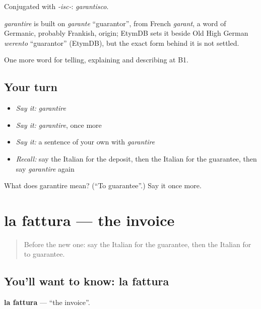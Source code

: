 Conjugated with \emph{-isc-}: \emph{garantisco}.

\begin{cousinweb}
\emph{garantire} is built on \emph{garante} \textquotedblleft{}guarantor\textquotedblright{}, from French \emph{garant}, a word of Germanic, probably Frankish, origin; EtymDB sets it beside Old High German \emph{werento} \textquotedblleft{}guarantor\textquotedblright{} (EtymDB), but the exact form behind it is not settled.
\end{cousinweb}

\begin{grammarlens}[title={What you've built}]
One more word for telling, explaining and describing at B1.
\end{grammarlens}

\subsection*{Your turn}
\begin{itemize}
\raggedright
  \item \emph{Say it:} \emph{garantire}
  \item \emph{Say it:} \emph{garantire}, once more
  \item \emph{Say it:} a sentence of your own with \emph{garantire}
  \item \emph{Recall:} say the Italian for the deposit, then the Italian for the guarantee, then say \emph{garantire} again
\end{itemize}

\begin{tcolorbox}[breakable,colback=teal!4,colframe=teal!35!black,title={Before you move on}]
What does garantire mean? (\textquotedblleft{}To guarantee\textquotedblright{}.) Say it once more.
\end{tcolorbox}
\section[la fattura]{la fattura — the invoice}

\label{lesson:IT-C397-fattura}



\begin{quote}
Before the new one: say the Italian for the guarantee, then the Italian for to guarantee.
\end{quote}

\subsection*{You'll want to know: la fattura}
\textbf{la fattura} — \textquotedblleft{}the invoice\textquotedblright{}.


